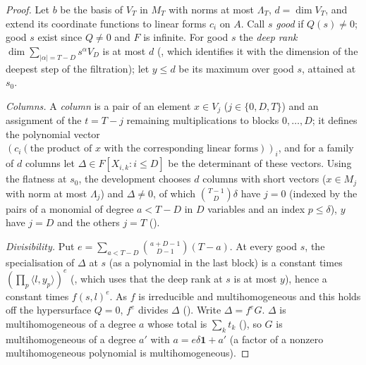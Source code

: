 \begin{proof}
Let $b$ be the basis of $V_T$ in $M_T$ with norms at most $\Lambda_T$, $d=\dim V_T$, and extend its
coordinate functions to linear forms $c_i$ on $A$. Call $s$ \emph{good} if $Q(s)\ne0$; good $s$ exist since
$Q\ne0$ and $F$ is infinite. For good $s$ the \emph{deep rank}
$\dim\sum_{|\alpha|=T-D}s^\alpha V_D$ is at most $d$
(, which identifies it with the
dimension of the deepest step of the filtration); let $y\le d$ be its maximum over good $s$, attained at
$s_0$.

\emph{Columns.} A \emph{column} is a pair of an element $x\in V_j$ ($j\in\{0,D,T\}$) and an assignment of
the $t=T-j$ remaining multiplications to blocks $0,\dots,D$; it defines the polynomial vector
$(c_i(\text{the product of }x\text{ with the corresponding linear forms}))_i$, and for a family of $d$ columns
let $\Delta\in F[X_{i,k}:i\le D]$ be the determinant of these vectors. Using the flatness at $s_0$, the
development chooses $d$ columns with short vectors ($x\in M_j$ with norm at most $\Lambda_j$) and
$\Delta\ne0$, of which $\binom{T-1}D\delta$ have $j=0$ (indexed by the pairs of a monomial of degree
$a<T-D$ in $D$ variables and an index $p\le\delta$), $y$ have $j=D$ and the others $j=T$
().

\emph{Divisibility.} Put $e=\sum_{a<T-D}\binom{a+D-1}{D-1}(T-a)$. At every good $s$, the specialisation of
$\Delta$ at $s$ (as a polynomial in the last block) is a constant times $(\prod_p\langle l,y_p\rangle)^e$
(, which uses that the deep
rank at $s$ is at most $y$), hence a constant times $f(s,l)^e$. As $f$ is irreducible and multihomogeneous
and this holds off the hypersurface $Q=0$, $f^e$ divides $\Delta$
(). Write $\Delta=f^eG$. $\Delta$ is
multihomogeneous of a degree $a$ whose total is $\sum_kt_k$
(), so $G$ is multihomogeneous of a degree $a'$ with
$a=e\delta\mathbf 1+a'$ (a factor of a nonzero multihomogeneous polynomial is multihomogeneous).


\end{proof}
